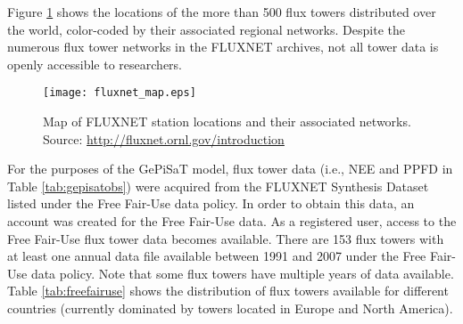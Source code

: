 Figure \ref{fig:fluxmap} shows the locations of the more than 500 flux towers distributed over the world, color-coded by their associated regional networks. 
Despite the numerous flux tower networks in the FLUXNET archives, not all tower data is openly accessible to researchers.
\begin{figure}[ht!]
    \texttt{[image: fluxnet\_map.eps]}
    \caption{Map of FLUXNET station locations and their associated networks.  Source: \url{http://fluxnet.ornl.gov/introduction}}
    \label{fig:fluxmap}
\end{figure}

For the purposes of the GePiSaT model, flux tower data (i.e., NEE and PPFD in Table \ref{tab:gepisatobs}) were acquired from the FLUXNET Synthesis Dataset\footnotemark {} listed under the Free Fair-Use data policy.  
In order to obtain this data, an account was created for the Free Fair-Use data\footnotemark {}.  
As a registered user, access to the Free Fair-Use flux tower data becomes available.  
There are 153 flux towers with at least one annual data file available between 1991 and 2007 under the Free Fair-Use data policy.  
Note that some flux towers have multiple years of data available. 
Table \ref{tab:freefairuse} shows the distribution of flux towers available for different countries (currently dominated by towers located in Europe and North America). 
